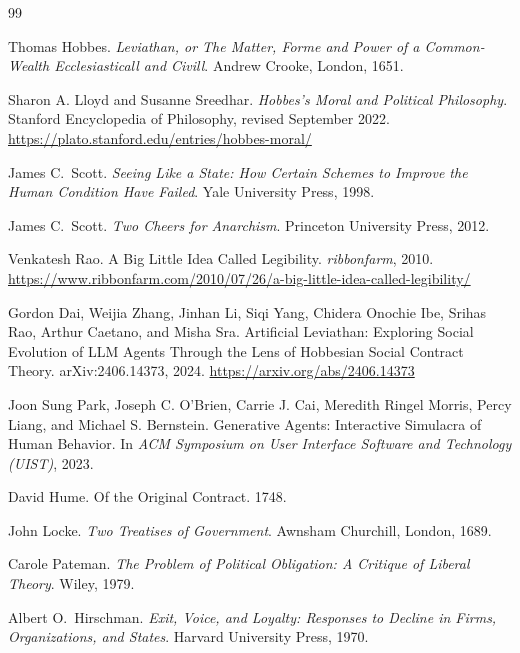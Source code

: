 \documentclass[11pt,a4paper]{article}
\theoremstyle{definition}
\theoremstyle{plain}
\begin{document}

\pdprintsolutions
\begin{thebibliography}{99}

Thomas Hobbes.
\newblock \textit{Leviathan, or The Matter, Forme and Power of a Common-Wealth Ecclesiasticall and Civill}.
\newblock Andrew Crooke, London, 1651.

Sharon A. Lloyd and Susanne Sreedhar.
\newblock \textit{Hobbes's Moral and Political Philosophy}.
\newblock Stanford Encyclopedia of Philosophy, revised September 2022.
\newblock \url{https://plato.stanford.edu/entries/hobbes-moral/}

James C.\ Scott.
\newblock \textit{Seeing Like a State: How Certain Schemes to Improve the Human Condition Have Failed}. Yale University Press, 1998.

James C.\ Scott.
\newblock \textit{Two Cheers for Anarchism}. Princeton University Press, 2012.

Venkatesh Rao.
\newblock A Big Little Idea Called Legibility. \textit{ribbonfarm}, 2010.
\newblock \url{https://www.ribbonfarm.com/2010/07/26/a-big-little-idea-called-legibility/}

Gordon Dai, Weijia Zhang, Jinhan Li, Siqi Yang, Chidera Onochie Ibe, Srihas Rao, Arthur Caetano, and Misha Sra.
\newblock Artificial Leviathan: Exploring Social Evolution of LLM Agents Through the Lens of Hobbesian Social Contract Theory.
\newblock arXiv:2406.14373, 2024. \url{https://arxiv.org/abs/2406.14373}

Joon Sung Park, Joseph C. O'Brien, Carrie J. Cai, Meredith Ringel Morris, Percy Liang, and Michael S. Bernstein.
\newblock Generative Agents: Interactive Simulacra of Human Behavior.
\newblock In \textit{ACM Symposium on User Interface Software and Technology (UIST)}, 2023.

David Hume.
\newblock Of the Original Contract. 1748.

John Locke.
\newblock \textit{Two Treatises of Government}.
\newblock Awnsham Churchill, London, 1689.

Carole Pateman.
\newblock \textit{The Problem of Political Obligation: A Critique of Liberal Theory}. Wiley, 1979.

Albert O.\ Hirschman.
\newblock \textit{Exit, Voice, and Loyalty: Responses to Decline in Firms, Organizations, and States}. Harvard University Press, 1970.


\end{thebibliography}
\end{document}
